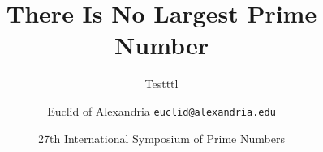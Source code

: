\documentclass{beamer}
\title{There Is No Largest Prime Number}
\subtitle{Testttl}
\date[ISPN ’80]{27th International Symposium of Prime Numbers}
\author[Euclid]{Euclid of Alexandria \texttt{euclid@alexandria.edu}}
\begin{document}
\begin{frame}
\titlepage
\end{frame}
\end{document}

